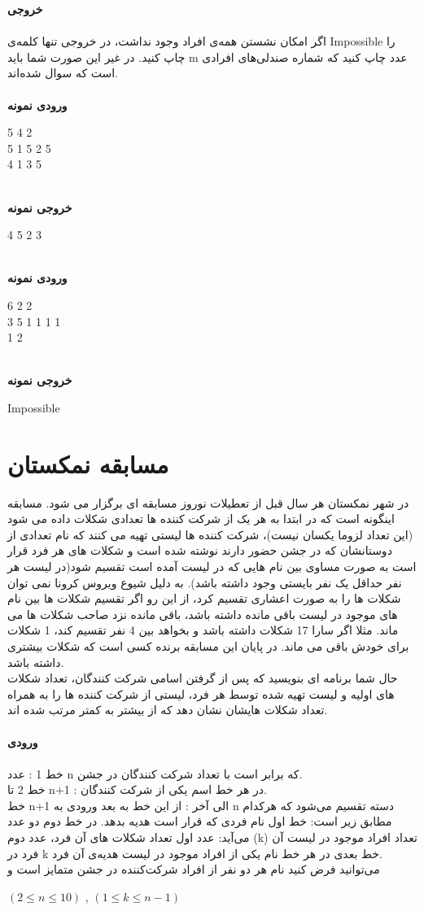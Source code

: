 \documentclass[]{article}
\newcommand{\inputsample}[1]{
    ~\\
    \textbf{ورودی نمونه}
    ~\\
    \begin{tcolorbox}[breakable,boxrule=0pt]
        \begin{latin}
            \large{
                #1
            }
        \end{latin}
    \end{tcolorbox}
}
\newcommand{\outputsample}[1]{
    ~\\
    \textbf{خروجی نمونه}

    \begin{tcolorbox}[breakable,boxrule=0pt]
        \begin{latin}
            \large{
                #1
            }
        \end{latin}
    \end{tcolorbox}
}
\begin{document}
\textbf{خروجی}
\\\\
اگر امکان نشستن همه‌ی افراد وجود نداشت، در خروجی تنها کلمه‌ی Impossible را چاپ کنید. در غیر این صورت شما باید m عدد چاپ کنید که شماره صندلی‌های افرادی است که سوال شده‌اند.\\
\inputsample{
5 4 2\\
5 1 5 2 5\\
4 1 3 5
}
\outputsample{
4 5 2 3
}
\newpage

\inputsample{
6 2 2\\
3 5 1 1 1 1\\
1 2
}
\outputsample{
Impossible
}

\newpage


\section{مسابقه نمکستان}

در شهر نمکستان هر سال قبل از تعطیلات نوروز مسابقه ای برگزار می شود. مسابقه اینگونه است که در ابتدا به هر یک از شرکت کننده ها تعدادی شکلات داده می شود (این تعداد لزوما یکسان نیست)، شرکت کننده ها لیستی تهیه می کنند که نام تعدادی از دوستانشان که در جشن حضور دارند نوشته شده است و شکلات های هر فرد قرار است به صورت مساوی بین نام هایی که در لیست آمده است تقسیم شود(در لیست هر نفر حداقل یک نفر بایستی وجود داشته باشد). به دلیل شیوع ویروس کرونا نمی توان شکلات ها را به صورت اعشاری تقسیم کرد، از این رو اگر تقسیم شکلات ها بین نام های موجود در لیست باقی مانده داشته باشد، باقی مانده نزد صاحب شکلات ها می ماند. مثلا اگر سارا 17 شکلات داشته باشد و بخواهد بین 4 نفر تقسیم کند، 1 شکلات برای خودش باقی می ماند. در پایان این مسابقه برنده کسی است که شکلات بیشتری داشته باشد.\\ 
حال شما برنامه ای بنویسید که پس از گرفتن اسامی شرکت کنندگان، تعداد شکلات های اولیه و لیست تهیه شده توسط هر فرد، لیستی از شرکت کننده ها را به همراه تعداد شکلات هایشان نشان دهد که از بیشتر به کمتر مرتب شده اند.\\
\\
\textbf{ورودی}\\\\
خط 1 : عدد n  که برابر است با تعداد شرکت کنندگان در جشن.\\
خط 2 تا n+1  : در هر خط اسم یکی از شرکت کنندگان.\\
خط n+1  الی آخر : از این خط به بعد ورودی به n  دسته تقسیم می‌شود که هرکدام مطابق زیر است: خط اول نام فردی که قرار است هدیه بدهد. در خط دوم دو عدد می‌آید: عدد اول تعداد شکلات های آن فرد، عدد دوم (k)  تعداد افراد موجود در لیست آن فرد در k  خط بعدی در هر خط نام یکی از افراد موجود در لیست هدیه‌ی آن فرد.\\
می‌توانید فرض کنید نام هر دو نفر از افراد شرکت‌کننده در جشن متمایز است و\\
\begin{latin}
$(2 \leq n \leq 10)$ , 
 $(	1\leq k \leq  n-1 )$\\
\end{latin}
      
\end{document}

